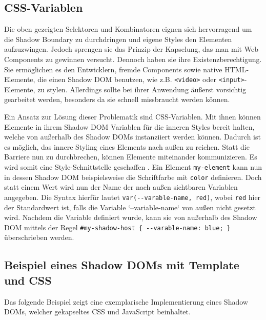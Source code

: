 \subsection{CSS-Variablen}\label{css-variablen}

Die oben gezeigten Selektoren und Kombinatoren eignen sich hervorragend um die Shadow Boundary zu durchdringen und eigene Styles den Elementen aufzuzwingen. Jedoch sprengen sie das Prinzip der Kapselung, das man mit Web Components zu gewinnen versucht. Dennoch haben sie ihre Existenzberechtigung. Sie ermöglichen es den Entwicklern, fremde Components sowie native HTML-Elemente, die einen Shadow DOM benutzen, wie z.B. \texttt{\textless{}video\textgreater{}} oder \texttt{\textless{}input\textgreater{}}-Elemente, zu stylen. Allerdings sollte bei ihrer Anwendung äußerst vorsichtig gearbeitet werden, besonders da sie schnell missbraucht werden können.

Ein Ansatz zur Lösung dieser Problematik sind CSS-Variablen. Mit ihnen können Elemente in ihrem Shadow DOM Variablen für die inneren Styles bereit halten, welche von außerhalb des Shadow DOMs instanziiert werden können. Dadurch ist es möglich, das innere Styling eines Elements nach außen zu reichen. Statt die Barriere nun zu durchbrechen, können Elemente miteinander kommunizieren. Es wird somit eine Style-Schnittstelle geschaffen \cite{citeulike:13883381}. Ein Element \texttt{my-element} kann nun in dessen Shadow DOM beispielsweise die Schriftfarbe mit \texttt{color} definieren. Doch statt einem Wert wird nun der Name der nach außen sichtbaren Variablen angegeben. Die Syntax hierfür lautet \texttt{var(-\/-varable-name,\ red)}, wobei \texttt{red} hier der Standardwert ist, falls die Variable `--variable-name` von außen nicht gesetzt wird. Nachdem die Variable definiert wurde, kann sie von außerhalb des Shadow DOM mittels der Regel \texttt{\#my-shadow-host\ \{\ -\/-varable-name:\ blue;\ \}} überschrieben werden.

\subsection{Beispiel eines Shadow DOMs mit Template und CSS}\label{beispiel-eines-shadow-doms-mit-template-und-css}

Das folgende Beispiel zeigt eine exemplarische Implementierung eines Shadow DOMs, welcher gekapseltes CSS und JavaScript beinhaltet.

